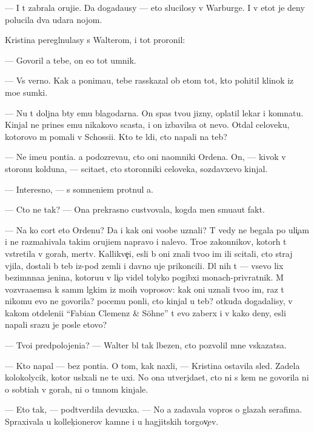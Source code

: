 \documentclass[10pt]{book}
\begin{document}
— I t{\yi} zabrala oruji{\y}e. Da{\y} dogada{\y}usy — eto slucilosy v Warburge. I v etot je deny polucila dva udara nojom.

Kristina peregl{\ia}nulasy s Walterom, i tot proronil:

— Govoril {\y}a tebe, on {\y}e{\x}o tot umnik.

— Vs{\e} verno. Kak {\y}a ponima{\y}u, tebe rasskazal ob etom tot, kto pohitil klinok iz mo{\y}e{\y} sumki.

— Nu t{\yi} doljna b{\yi}ty {\y}emu blagodarna. On spas tvo{\y}u jizny, oplatil lekar{\ia} i komnatu. Kinjal ne prines {\y}emu nikakovo scast{\y}a, i on izbavilsa ot nevo. Otdal celoveku, kotorovo m{\yi} po{\y}mali v Schossi{\y}i. Kto te l{\io}di, cto napali na teb{\ia}?

— Ne ime{\y}u pon{\ia}ti{\y}a. {\Y}a podozreva{\y}u, cto oni na{\y}omniki Ordena. On, — kivok v storonu kolduna, — sci\-ta\-{\y}et, cto storonniki celoveka, sozdavxevo kinjal.

— Interesno, — s somneni{\y}em pro\-t{\ia}\-nul {\y}a.

— Cto ne tak? — Ona pre\-kras\-no custvovala, kogda men{\ia} smu{\x}a{\y}ut fakt{\yi}.

— Na ko{\y} cort eto Ordenu? Da i kak oni voob{\x}e uznali? T{\yi} vedy ne begala po uli{\c}am i ne razmahivala takim oruji{\y}em napravo i nalevo. Tro{\y}e zakonnikov, kotor{\yi}h t{\yi} vstretila v gorah, mertv{\yi}. Kallikve{\c}i, {\y}esli b{\yi} oni znali tvo{\y}o im{\ia} ili scitali, cto straj v{\yi}jila, dostali b{\yi} teb{\ia} iz-pod zemli i davno uje prikoncili. Dl{\ia} nih t{\yi} — vsevo lix bez\-im{\ia}n\-na{\y}a jen{\x}ina, kotoru{\y}u v li{\c}o videl tolyko pogibxi{\y} monach-privratnik. M{\yi} vozvra{\x}a{\y}emsa k sam{\yi}m l{\e}gkim iz mo{\y}ih voprosov: kak oni uznali tvo{\y}o im{\ia}, raz t{\yi} nikomu {\y}evo ne govorila? pocemu pon{\ia}li, cto kinjal u teb{\ia}? otkuda do\-ga\-da\-lisy, v kakom otdeleni{\y}i ``Fabian Clemenz \& Söhne'' t{\yi} {\y}evo zaber{\e}x i v kako{\y} deny, {\y}esli napali srazu je posle etovo?

— Tvo{\y}i predpolojeni{\y}a? — Walter b{\yi}l tak l{\io}bezen, cto pozvolil mne v{\yi}skazatsa.

— Kto napal — bez pon{\ia}ti{\y}a. O tom, kak naxli, — Kristina ostavila sled{\yi}. Zadela kolokolycik, kotor{\yi}{\y} usl{\yi}xali ne te uxi. No ona utverjda{\y}et, cto ni s kem ne govorila ni o sob{\yi}ti{\y}ah v gorah, ni o t{\e}mnom kinjale.

— Eto tak, — podtverdila devuxka. — No {\y}a zadavala vopros{\yi} o glazah serafima. Spraxivala u kollek{\c}ionerov kamne{\y} i u hagjitskih torgov{\c}ev.
\end{document}
